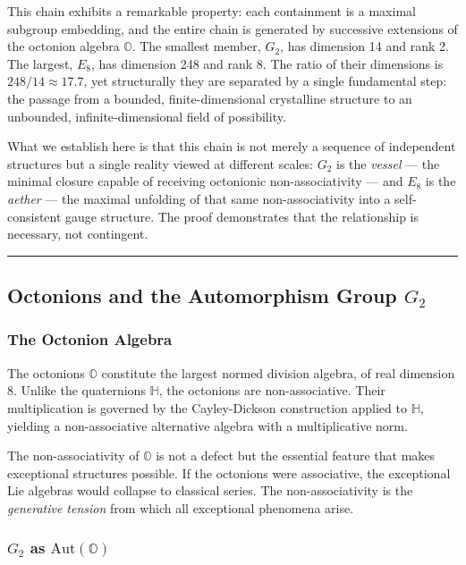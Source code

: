 \documentclass[12pt,a4paper]{article}
\begin{document}
This chain exhibits a remarkable property: each containment is a maximal subgroup embedding, and the entire chain is generated by successive extensions of the octonion algebra $\mathbb{O}$. The smallest member, $G_2$, has dimension 14 and rank 2. The largest, $E_8$, has dimension 248 and rank 8. The ratio of their dimensions is $248/14 \approx 17.7$, yet structurally they are separated by a single fundamental step: the passage from a bounded, finite-dimensional crystalline structure to an unbounded, infinite-dimensional field of possibility.

What we establish here is that this chain is not merely a sequence of independent structures but a single reality viewed at different scales: $G_2$ is the \emph{vessel} --- the minimal closure capable of receiving octonionic non-associativity --- and $E_8$ is the \emph{aether} --- the maximal unfolding of that same non-associativity into a self-consistent gauge structure. The proof demonstrates that the relationship is necessary, not contingent.

\begin{center}
\rule{0.5\textwidth}{0.4pt}
\end{center}

\subsection{Octonions and the Automorphism Group $G_2$}

\subsubsection{The Octonion Algebra}

The octonions $\mathbb{O}$ constitute the largest normed division algebra, of real dimension 8. Unlike the quaternions $\mathbb{H}$, the octonions are non-associative. Their multiplication is governed by the Cayley-Dickson construction applied to $\mathbb{H}$, yielding a non-associative alternative algebra with a multiplicative norm.

The non-associativity of $\mathbb{O}$ is not a defect but the essential feature that makes exceptional structures possible. If the octonions were associative, the exceptional Lie algebras would collapse to classical series. The non-associativity is the \emph{generative tension} from which all exceptional phenomena arise.

\subsubsection{$G_2$ as $\text{Aut}(\mathbb{O})$}
\end{document}
